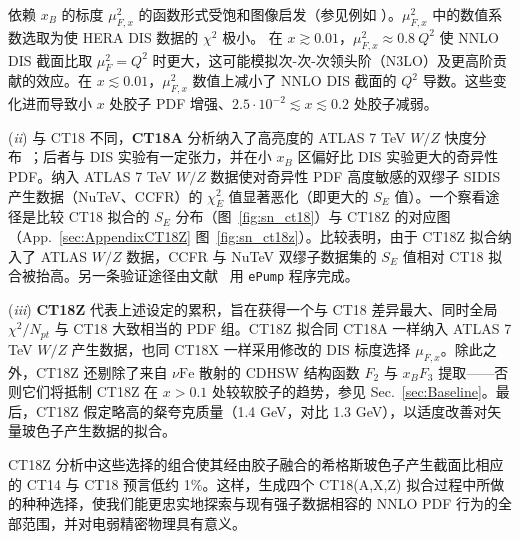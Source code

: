 依赖 $x_B$ 的标度 $\mu^2_{F,x}$ 的函数形式受饱和图像启发（参见例如
\cite{GolecBiernat:1998js,Caola:2009iy}）。$\mu^2_{F,x}$ 中的数值系数选取为使 HERA DIS 数据的 $\chi^2$ 极小。
在 $x\gtrsim 0.01$，$\mu_{F,x}^2\approx 0.8\ Q^2$ 使 NNLO DIS 截面比取 $\mu_{F}^2=Q^2$ 时更大，这可能模拟次-次-次领头阶（N3LO）及更高阶贡献的效应。在 $x \lesssim 0.01$，$\mu_{F,x}^2$ 数值上减小了 NNLO DIS 截面的 $Q^2$ 导数。这些变化进而导致小 $x$ 处胶子 PDF 增强、$2.5\cdot 10^{-2} \lesssim  x\lesssim 0.2$ 处胶子减弱。

({\it ii}) 与 CT18 不同，{\bf CT18A} 分析纳入了高亮度的 ATLAS 7 TeV $W/Z$ 快度分布~\cite{Aaboud:2016btc}；后者与 DIS 实验有一定张力，并在小 $x_B$ 区偏好比 DIS 实验更大的奇异性 PDF。纳入 ATLAS 7 TeV $W/Z$ 数据使对奇异性 PDF 高度敏感的双缪子 SIDIS 产生数据（NuTeV、CCFR）的 $\chi^2_E$ 值显著恶化（即更大的 $S_E$ 值）。一个察看途径是比较 CT18 拟合的 $S_E$ 分布（图~\ref{fig:sn_ct18}）与 CT18Z 的对应图（App.~\ref{sec:AppendixCT18Z} 图~\ref{fig:sn_ct18z}）。比较表明，由于 CT18Z 拟合纳入了 ATLAS $W/Z$ 数据，CCFR 与 NuTeV 双缪子数据集的 $S_E$ 值相对 CT18 拟合被抬高。另一条验证途径由文献~\cite{Hou:2019gfw} 用 \texttt{ePump} 程序完成。

({\it iii}) {\bf CT18Z} 代表上述设定的累积，旨在获得一个与 CT18 差异最大、同时全局 $\chi^2/N_{pt}$ 与 CT18 大致相当的 PDF 组。CT18Z 拟合同 CT18A 一样纳入 ATLAS 7 TeV $W/Z$ 产生数据，也同 CT18X 一样采用修改的 DIS 标度选择 $\mu_{F,x}$。除此之外，CT18Z 还剔除了来自 $\nu\mathrm{Fe}$ 散射的 CDHSW 结构函数 $F_2$ 与 $x_B F_3$ 提取——否则它们将抵制 CT18Z 在 $x>0.1$ 处较软胶子的趋势，参见 Sec.~\ref{sec:Baseline}。最后，CT18Z 假定略高的粲夸克质量（1.4 GeV，对比 1.3 GeV），以适度改善对矢量玻色子产生数据的拟合。

CT18Z 分析中这些选择的组合使其经由胶子融合的希格斯玻色子产生截面比相应的 CT14 与 CT18 预言低约 1\%。这样，生成四个 CT18(A,X,Z) 拟合过程中所做的种种选择，使我们能更忠实地探索与现有强子数据相容的 NNLO PDF 行为的全部范围，并对电弱精密物理具有意义。
